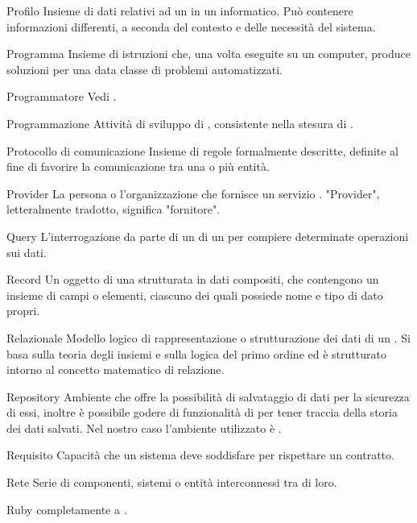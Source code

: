 \elemento
{Profilo}
{Insieme di dati relativi ad un  in un  informatico. Può contenere informazioni differenti, a seconda del contesto e delle necessità del sistema.}

\elemento
{Programma}
{Insieme di istruzioni che, una volta eseguite su un computer, produce soluzioni per una data classe di problemi automatizzati.
}

\elemento
{Programmatore}
{Vedi .}

\elemento
{Programmazione}
{Attività di sviluppo di , consistente nella stesura di .
}

\elemento
{Protocollo di comunicazione}
{Insieme di regole formalmente descritte, definite al fine di favorire la comunicazione tra una o più entità.
}

\elemento
{Provider}
{La persona o l'organizzazione che fornisce un servizio . "Provider", letteralmente tradotto, significa "fornitore".}


\elemento
{Query}
{L'interrogazione da parte di un  di un  per compiere determinate operazioni sui dati.
}


\elemento
{Record}
{Un oggetto di una  strutturata in dati compositi, che contengono un insieme di campi o elementi, ciascuno dei quali possiede nome e tipo di dato propri.}

\elemento
{Relazionale}
{Modello logico di rappresentazione o strutturazione dei dati di un . Si basa sulla teoria degli insiemi e sulla logica del primo ordine ed è strutturato intorno al concetto matematico di relazione.}

\elemento
{Repository}
{Ambiente che offre la possibilità di salvataggio di dati per la sicurezza di essi, inoltre è possibile godere di funzionalità di  per tener traccia della storia dei dati salvati. Nel nostro caso l'ambiente utilizzato è .}

\elemento
{Requisito}
{Capacità che un sistema  deve soddisfare per rispettare un contratto.}

\elemento
{Rete}
{Serie di componenti, sistemi o entità interconnessi tra di loro.}

\elemento
{Ruby}
{ completamente a .}

